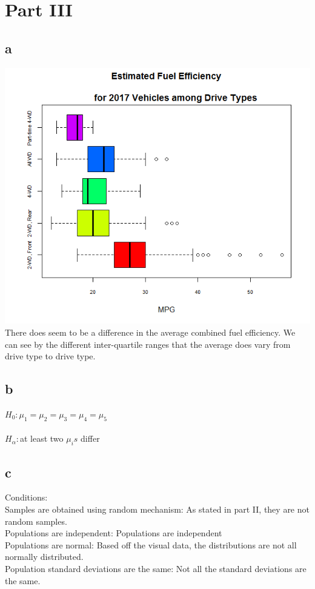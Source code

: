 \documentclass[10pt,letterpaper]{article}
\begin{document}
\section*{Part III}
\subsection*{a}
\includegraphics[scale=1.0]{anova}\\
There does seem to be a difference in the average combined fuel efficiency. We
can see by the different inter-quartile ranges that the average does vary from
drive type to drive type.

\subsection*{b}
$H_0:\mu_1 = \mu_2 = \mu_3 = \mu_4 = \mu_5$\\\\
$H_\alpha:$at least two $\mu_is$ differ

\subsection*{c}
Conditions:\\
Samples are obtained using random mechanism: As stated in part II, they are not
random samples.\\
Populations are independent: Populations are independent\\
Populations are normal: Based off the visual data, the distributions are not all
normally distributed.\\
Population standard deviations are the same: Not all the standard deviations are
the same.\\
\end{document}
